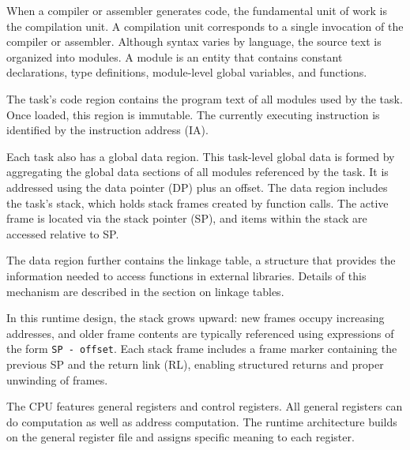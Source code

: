 When a compiler or assembler generates code, the fundamental unit of work is the compilation unit. A compilation unit corresponds to a single invocation of the compiler or assembler. Although syntax varies by language, the source text is organized into modules. A module is an entity that contains constant declarations, type definitions, module-level global variables, and functions.

The task’s code region contains the program text of all modules used by the task. Once loaded, this region is immutable. The currently executing instruction is identified by the instruction address (IA).

Each task also has a global data region. This task-level global data is formed by aggregating the global data sections of all modules referenced by the task. It is addressed using the data pointer (DP) plus an offset. The data region includes the task’s stack, which holds stack frames created by function calls. The active frame is located via the stack pointer (SP), and items within the stack are accessed relative to SP.

The data region further contains the linkage table, a structure that provides the information needed to access functions in external libraries. Details of this mechanism are described in the section on linkage tables.

In this runtime design, the stack grows upward: new frames occupy increasing addresses, and older frame contents are typically referenced using expressions of the form \texttt{SP - offset}. Each stack frame includes a frame marker containing the previous SP and the return link (RL), enabling structured returns and proper unwinding of frames. 


The CPU features general registers and control registers. All general registers can do computation as well as address computation. The runtime architecture builds on the general register file and assigns specific meaning to each register. 

